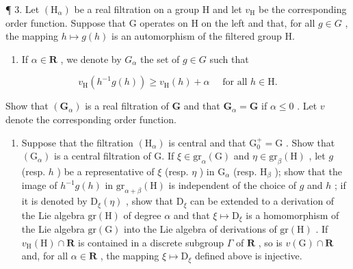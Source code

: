¶ 3. Let \((\mathrm{H}_{\alpha})\) be a real filtration on a group H and let \(v_{\mathrm{H}}\) be the corresponding order function. Suppose that G operates on H on the left and that, for all \(g \in G\) , the mapping \(h \mapsto g(h)\) is an automorphism of the filtered group H.

\begin{enumerate}
\def\labelenumi{(\alph{enumi})}
\tightlist
\item
  If \(\alpha \in \mathbf{R}\) , we denote by \(G_{\alpha}\) the set of \(g \in G\) such that
\end{enumerate}

\[
v _ {\mathrm{H}} (h ^ {- 1} g (h)) \geqslant v _ {\mathrm{H}} (h) + \alpha \quad \text { for   all } h \in \mathrm{H}.
\]

Show that \((\mathbf{G}_{\alpha})\) is a real filtration of \(\mathbf{G}\) and that \(\mathbf{G}_{\alpha} = \mathbf{G}\) if \(\alpha \leqslant 0\) . Let \(v\) denote the corresponding order function.

\begin{enumerate}
\def\labelenumi{(\alph{enumi})}
\setcounter{enumi}{1}
\tightlist
\item
  Suppose that the filtration \((\mathrm{H}_{\alpha})\) is central and that \(\mathrm{G}_0^+ = \mathrm{G}\) . Show that \((\mathrm{G}_{\alpha})\) is a central filtration of G. If \(\xi \in \mathrm{gr}_{\alpha}(\mathrm{G})\) and \(\eta \in \mathrm{gr}_{\beta}(\mathrm{H})\) , let \(g\) (resp. \(h\) ) be a representative of \(\xi\) (resp. \(\eta\) ) in \(\mathrm{G}_{\alpha}\) (resp. \(\mathrm{H}_{\beta}\) ); show that the image of \(h^{-1}g(h)\) in \(\mathrm{gr}_{\alpha + \beta}(\mathrm{H})\) is independent of the choice of \(g\) and \(h\) ; if it is denoted by \(\mathrm{D}_{\xi}(\eta)\) , show that \(\mathrm{D}_{\xi}\) can be extended to a derivation of the Lie algebra \(\mathrm{gr}(\mathrm{H})\) of degree \(\alpha\) and that \(\xi \mapsto \mathrm{D}_{\xi}\) is a homomorphism of the Lie algebra \(\mathrm{gr}(\mathrm{G})\) into the Lie algebra of derivations of \(\mathrm{gr}(\mathrm{H})\) . If \(v_{\mathrm{H}}(\mathrm{H}) \cap \mathbf{R}\) is contained in a discrete subgroup \(\Gamma\) of \(\mathbf{R}\) , so is \(v(\mathrm{G}) \cap \mathbf{R}\) and, for all \(\alpha \in \mathbf{R}\) , the mapping \(\xi \mapsto \mathrm{D}_{\xi}\) defined above is injective.
\end{enumerate}


